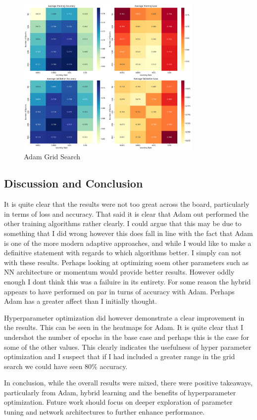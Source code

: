 \documentclass[conference]{IEEEtran}
\begin{document}
\begin{figure}[h]  %
    \centering  %
    \includegraphics[width=0.8\textwidth]{./images/GridSearch_ADAM.png}  %
    \caption{Adam Grid Search}  %
    \label{fig:sample_image}  %
\end{figure}
\subsection{Discussion and Conclusion}
It is quite clear that the results were not too great across the board, particularly in terms of loss and accuracy. That said it is clear that Adam out performed the other training algorithms rather clearly. I could argue that this may be due to something that I did wrong however this does fall in line with the fact that Adam is one of the more modern adaptive approaches, and while I would like to make a definitive statement with regards to which algorithms better. I simply can not with these results. Perhaps looking at optimizing soem other parameters such as NN architecture or momentum would provide better results. However oddly enough I dont think this was a failuire in its entirety. For some reason the hybrid appears to have performed on par in turns of accuracy with Adam. Perhaps Adam has a greater affect than I initially thought.

Hyperparameter optimization did however demonstrate a clear improvement in the results. This can be seen in the heatmaps for Adam. It is quite clear that I undershot the number of epochs in the base case and perhaps this is the case for some of the other values. This clearly indicates the usefulness of hyper parameter optimization and I suspect that if I had included a greater range in the grid search we could have seen 80\% accuracy.

In conclusion, while the overall results were mixed, there were positive takeaways, particularly from Adam, hybrid learning and the benefits of hyperparameter optimization. Future work should focus on deeper exploration of parameter tuning and network architectures to further enhance performance.


\end{document}
